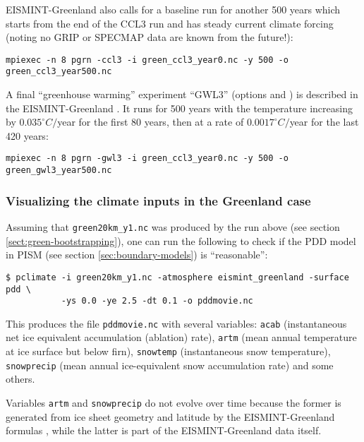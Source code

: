EISMINT-Greenland also calls for a baseline run for another 500 years which starts from the end of the CCL3 run and has steady current climate forcing (noting no GRIP or SPECMAP data are known from the future!):

\begin{verbatim}
mpiexec -n 8 pgrn -ccl3 -i green_ccl3_year0.nc -y 500 -o green_ccl3_year500.nc
\end{verbatim}

A final ``greenhouse warming'' experiment ``GWL3'' (options  and ) is described in the EISMINT-Greenland \cite{RitzEISMINT}.  It runs for 500 years with the temperature increasing by $0.035^\circ C/$year for the first 80 years, then at a rate of $0.0017^\circ C/$year for the last 420 years:

\begin{verbatim}
mpiexec -n 8 pgrn -gwl3 -i green_ccl3_year0.nc -y 500 -o green_gwl3_year500.nc
\end{verbatim}

\subsubsection*{Visualizing the climate inputs in the Greenland case}
\label{sec:pdd-series-with-pclimate}

Assuming that \texttt{green20km_y1.nc} was produced by the run above (see section
\ref{sect:green-bootstrapping}), one can run the following to check if the PDD
model in PISM (see section \ref{sec:boundary-models}) is ``reasonable'':
\begin{verbatim}
$ pclimate -i green20km_y1.nc -atmosphere eismint_greenland -surface pdd \
           -ys 0.0 -ye 2.5 -dt 0.1 -o pddmovie.nc 
\end{verbatim}%
This produces the file \texttt{pddmovie.nc} with several variables: \texttt{acab}
(instantaneous net ice equivalent accumulation (ablation) rate), \texttt{artm}
(mean annual temperature at ice surface but below firn), \texttt{snowtemp}
(instantaneous snow temperature), \texttt{snowprecip} (mean annual
ice-equivalent snow accumulation rate) and some others.

Variables \texttt{artm} and \texttt{snowprecip} do not evolve over time because the 
former is generated from ice sheet geometry and latitude by the EISMINT-Greenland
formulas \cite{RitzEISMINT}, while the latter is part of the EISMINT-Greenland data
itself.

